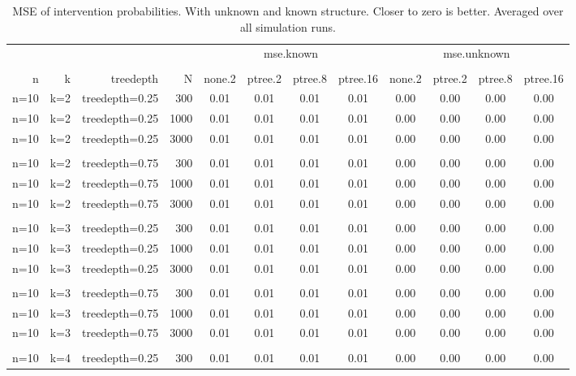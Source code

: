 \begin{table}[ht]
\centering
\caption{MSE of intervention probabilities. With unknown and known structure. Closer to zero is better. Averaged over all simulation runs.} 
\begin{tabular}{rrrr|cccc|cccc}
  \toprule
   & & & &\multicolumn{4}{c}{mse.known}&\multicolumn{4}{c}{mse.unknown}   \\ 
 \cline{5-12}  \\ 
 n & k & treedepth & N & none.2 & ptree.2 & ptree.8 & ptree.16 & none.2 & ptree.2 & ptree.8 & ptree.16  \\ 
 \midrule
n=10 & k=2 & treedepth=0.25 & 300 & 0.01 & 0.01 & 0.01 & 0.01 & 0.00 & 0.00 & 0.00 & 0.00 \\ 
  n=10 & k=2 & treedepth=0.25 & 1000 & 0.01 & 0.01 & 0.01 & 0.01 & 0.00 & 0.00 & 0.00 & 0.00 \\ 
  n=10 & k=2 & treedepth=0.25 & 3000 & 0.01 & 0.01 & 0.01 & 0.01 & 0.00 & 0.00 & 0.00 & 0.00 \\ 
   \\ 
n=10 & k=2 & treedepth=0.75 & 300 & 0.01 & 0.01 & 0.01 & 0.01 & 0.00 & 0.00 & 0.00 & 0.00 \\ 
  n=10 & k=2 & treedepth=0.75 & 1000 & 0.01 & 0.01 & 0.01 & 0.01 & 0.00 & 0.00 & 0.00 & 0.00 \\ 
  n=10 & k=2 & treedepth=0.75 & 3000 & 0.01 & 0.01 & 0.01 & 0.01 & 0.00 & 0.00 & 0.00 & 0.00 \\ 
   \\ 
n=10 & k=3 & treedepth=0.25 & 300 & 0.01 & 0.01 & 0.01 & 0.01 & 0.00 & 0.00 & 0.00 & 0.00 \\ 
  n=10 & k=3 & treedepth=0.25 & 1000 & 0.01 & 0.01 & 0.01 & 0.01 & 0.00 & 0.00 & 0.00 & 0.00 \\ 
  n=10 & k=3 & treedepth=0.25 & 3000 & 0.01 & 0.01 & 0.01 & 0.01 & 0.00 & 0.00 & 0.00 & 0.00 \\ 
   \\ 
n=10 & k=3 & treedepth=0.75 & 300 & 0.01 & 0.01 & 0.01 & 0.01 & 0.00 & 0.00 & 0.00 & 0.00 \\ 
  n=10 & k=3 & treedepth=0.75 & 1000 & 0.01 & 0.01 & 0.01 & 0.01 & 0.00 & 0.00 & 0.00 & 0.00 \\ 
  n=10 & k=3 & treedepth=0.75 & 3000 & 0.01 & 0.01 & 0.01 & 0.01 & 0.00 & 0.00 & 0.00 & 0.00 \\ 
   \\ 
n=10 & k=4 & treedepth=0.25 & 300 & 0.01 & 0.01 & 0.01 & 0.01 & 0.00 & 0.00 & 0.00 & 0.00 \\ 

\end{tabular}
\end{table}
